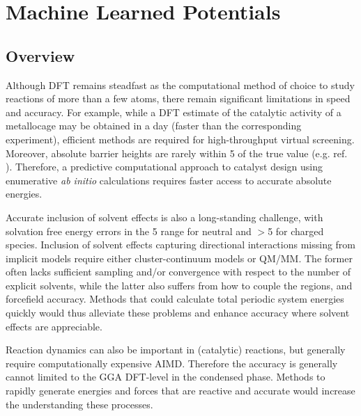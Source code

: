 \documentclass[../../main.tex]{subfiles}
\begin{document}
\setcounter{footnote}{0} 
\newcommand{\rom}[1]{\uppercase\expandafter{\romannumeral #1\relax}}


\chapter{Machine Learned Potentials}

\section{Overview}

Although DFT remains steadfast as the computational method of choice to study reactions of more than a few atoms,\cite{PribramJones2015} there remain significant limitations in speed and accuracy.\cite{Mardirossian2017} For example, while a DFT estimate of the catalytic activity of a metallocage may be obtained in a day\cite{Young2019} (faster than the corresponding experiment), efficient methods are required for high-throughput virtual screening. Moreover, absolute barrier heights are rarely within 5 \kcalx of the true value (e.g. ref. \cite{Krongchon2017}). Therefore, a predictive computational approach to catalyst design using enumerative \emph{ab initio} calculations requires faster access to accurate absolute energies. 

Accurate inclusion of solvent effects is also a long-standing challenge, with solvation free energy errors in the 5 \kcalx range for neutral and $>$5 \kcalx for charged species.\cite{Takano2004, Zhang2017} Inclusion of solvent effects capturing directional interactions missing from implicit models require either cluster-continuum models or QM/MM. The former often lacks sufficient sampling and/or convergence with respect to the number of explicit solvents,\cite{Basdogan2018} while the latter also suffers from how to couple the regions, and forcefield accuracy.\cite{Thiel2009} Methods that could calculate total periodic system energies quickly would thus alleviate these problems and enhance accuracy where solvent effects are appreciable.

Reaction dynamics can also be important in (catalytic) reactions,\cite{Grajciar2018, Stirling2014} but generally require computationally expensive AIMD. Therefore the accuracy is generally cannot limited to the GGA DFT-level in the condensed phase.\cite{Hassanali2014} Methods to rapidly generate energies and forces that are reactive and accurate would increase the understanding these processes.
\end{document}
